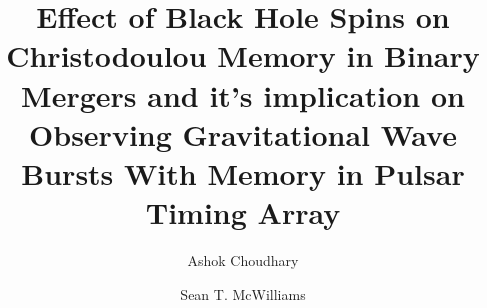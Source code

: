 \documentclass[twocolumn,showpacs,aps,prd,nobibnotes,floatfix]{revtex4-1}
\begin{document}
\newcommand{\be}{\begin{equation}}
\newcommand{\ee}{\end{equation}}
\newcommand{\ber}{\begin{eqnarray}}
\newcommand{\eer}{\end{eqnarray}}
\def\bea{\begin{eqnarray}}
\def\eea{\end{eqnarray}}
\newcommand{\etal}{\emph{et al.}}

\newcommand{\Sl}{S_\ell}
\newcommand{\Sigmal}{\Sigma_\ell}
\newcommand{\Flux}{\mathcal{F}}
\newcommand{\LNh}{\hat{\mathbf{L}}_N}
\newcommand{\LN}{\mathbf{L}_N}
\newcommand{\bS}{\mathbf{S}}
\newcommand{\bJ}{\mathbf{J}}
\newcommand{\e}{\mathrm{e}}
\newcommand{\rmi}{\mathrm{i}}
\newcommand{\flow}{f_\mathrm{low}}
\newcommand{\fcut}{f_\mathrm{cut}}

\newcommand{\bchi}{\bm{\chi}}
\newcommand{\blambda}{\bm{\lambda}}
\newcommand{\bLambda}{\bm{\Lambda}}
\newcommand{\bchia}{\bm{\chi}_a}
\newcommand{\bchis}{\bm{\chi}_s}
\newcommand{\chis}{\chi_s}
\newcommand{\chia}{\chi_a}
\newcommand{\chiadL}{\bchia \cdot \LNh}
\newcommand{\chisdL}{\bchis \cdot \LNh}
\newcommand{\chisSqr}{\bchis^2}
\newcommand{\chiaSqr}{\bchia^2}
\newcommand{\chisDchia}{\bchis \cdot \bchia}
\newcommand{\cA}{\mathcal{A}}
\newcommand{\cB}{\mathcal{B}}
\newcommand{\cC}{\mathcal{C}}
\newcommand{\cP}{\mathcal{P}}
\newcommand{\pc}{{+,\times}}

\title{Effect of Black Hole Spins on Christodoulou Memory in Binary Mergers and it's implication on Observing Gravitational Wave Bursts With Memory in Pulsar Timing Array}
\author{Ashok Choudhary}
\author{Sean T. McWilliams}
\end{document}
